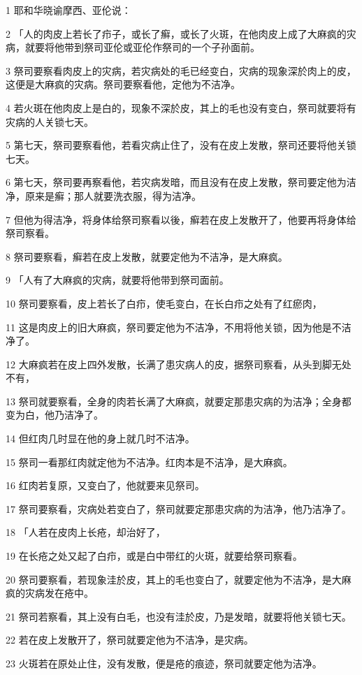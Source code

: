 \par 1 耶和华晓谕摩西、亚伦说：
\par 2 「人的肉皮上若长了疖子，或长了癣，或长了火斑，在他肉皮上成了大麻疯的灾病，就要将他带到祭司亚伦或亚伦作祭司的一个子孙面前。
\par 3 祭司要察看肉皮上的灾病，若灾病处的毛已经变白，灾病的现象深於肉上的皮，这便是大麻疯的灾病。祭司要察看他，定他为不洁净。
\par 4 若火斑在他肉皮上是白的，现象不深於皮，其上的毛也没有变白，祭司就要将有灾病的人关锁七天。
\par 5 第七天，祭司要察看他，若看灾病止住了，没有在皮上发散，祭司还要将他关锁七天。
\par 6 第七天，祭司要再察看他，若灾病发暗，而且没有在皮上发散，祭司要定他为洁净，原来是癣；那人就要洗衣服，得为洁净。
\par 7 但他为得洁净，将身体给祭司察看以後，癣若在皮上发散开了，他要再将身体给祭司察看。
\par 8 祭司要察看，癣若在皮上发散，就要定他为不洁净，是大麻疯。
\par 9 「人有了大麻疯的灾病，就要将他带到祭司面前。
\par 10 祭司要察看，皮上若长了白疖，使毛变白，在长白疖之处有了红瘀肉，
\par 11 这是肉皮上的旧大麻疯，祭司要定他为不洁净，不用将他关锁，因为他是不洁净了。
\par 12 大麻疯若在皮上四外发散，长满了患灾病人的皮，据祭司察看，从头到脚无处不有，
\par 13 祭司就要察看，全身的肉若长满了大麻疯，就要定那患灾病的为洁净；全身都变为白，他乃洁净了。
\par 14 但红肉几时显在他的身上就几时不洁净。
\par 15 祭司一看那红肉就定他为不洁净。红肉本是不洁净，是大麻疯。
\par 16 红肉若复原，又变白了，他就要来见祭司。
\par 17 祭司要察看，灾病处若变白了，祭司就要定那患灾病的为洁净，他乃洁净了。
\par 18 「人若在皮肉上长疮，却治好了，
\par 19 在长疮之处又起了白疖，或是白中带红的火斑，就要给祭司察看。
\par 20 祭司要察看，若现象洼於皮，其上的毛也变白了，就要定他为不洁净，是大麻疯的灾病发在疮中。
\par 21 祭司若察看，其上没有白毛，也没有洼於皮，乃是发暗，就要将他关锁七天。
\par 22 若在皮上发散开了，祭司就要定他为不洁净，是灾病。
\par 23 火斑若在原处止住，没有发散，便是疮的痕迹，祭司就要定他为洁净。
